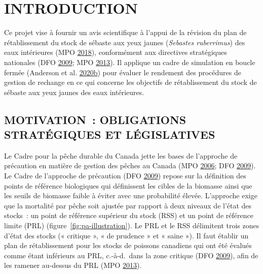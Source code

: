 \documentclass[french,11pt]{book}
\begin{document}
\renewcommand{\tablename}{Tableau}
\frontmatter

\clearpage

\hypertarget{sec:introduction}{%
\section{INTRODUCTION}\label{sec:introduction}}

Ce projet vise à fournir un avis scientifique à l'appui de la révision du plan de rétablissement du stock de sébaste aux yeux jaunes (\emph{Sebastes ruberrimus}) des eaux intérieures (MPO \protect\hyperlink{ref-ifmp2018}{2018}), conformément aux directives stratégiques nationales (DFO \protect\hyperlink{ref-dfo2009}{2009}; MPO \protect\hyperlink{ref-dfo2013}{2013}). Il applique un cadre de simulation en boucle fermée (Anderson et al. \protect\hyperlink{ref-anderson2020gfmp}{2020}\protect\hyperlink{ref-anderson2020gfmp}{b}) pour évaluer le rendement des procédures de gestion de rechange en ce qui concerne les objectifs de rétablissement du stock de sébaste aux yeux jaunes des eaux intérieures.

\hypertarget{sec:introduction-motivation}{%
\subsection{MOTIVATION~: OBLIGATIONS STRATÉGIQUES ET LÉGISLATIVES}\label{sec:introduction-motivation}}

Le Cadre pour la pêche durable du Canada jette les bases de l'approche de précaution en matière de gestion des pêches au Canada (MPO \protect\hyperlink{ref-dfo2006}{2006}; DFO \protect\hyperlink{ref-dfo2009}{2009}). Le Cadre de l'approche de précaution (DFO \protect\hyperlink{ref-dfo2009}{2009}) repose sur la définition des points de référence biologiques qui définissent les cibles de la biomasse ainsi que les seuils de biomasse faible à éviter avec une probabilité élevée. L'approche exige que la mortalité par pêche soit ajustée par rapport à deux niveaux de l'état des stocks~: un point de référence supérieur du stock (RSS) et un point de référence limite (PRL) (figure~\ref{fig:pa-illustration}). Le PRL et le RSS délimitent trois zones d'état des stocks (« critique », « de prudence » et « saine »). Il faut établir un plan de rétablissement pour les stocks de poissons canadiens qui ont été évalués comme étant inférieurs au PRL, c.-à-d.~dans la zone critique (DFO \protect\hyperlink{ref-dfo2009}{2009}), afin de les ramener au-dessus du PRL (MPO \protect\hyperlink{ref-dfo2013}{2013}).
\end{document}
